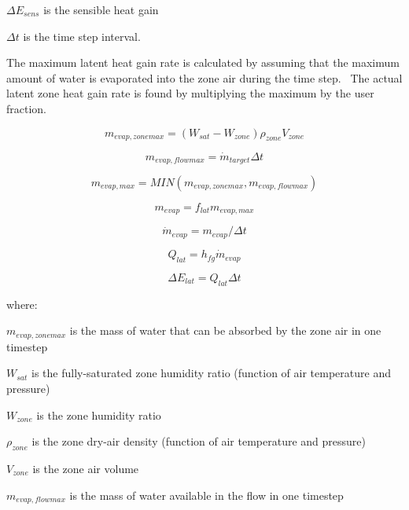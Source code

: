 \(\Delta {E_{sens}}\) is the sensible heat gain

\(\Delta t\) is the time step interval.

The maximum latent heat gain rate is calculated by assuming that the maximum amount of water is evaporated into the zone air during the time step.~ The actual latent zone heat gain rate is found by multiplying the maximum by the user fraction.

\begin{equation}
{m_{evap,zonemax}} = \left( {{W_{sat}} - {W_{zone}}} \right){\rho_{zone}}{V_{zone}}
\end{equation}

\begin{equation}
{m_{evap,flowmax}} = {\dot m_{target}}\Delta t
\end{equation}

\begin{equation}
{m_{evap,max}} = MIN({m_{evap,zonemax}},{m_{evap,flowmax}})
\end{equation}

\begin{equation}
{m_{evap}} = {f_{lat}}{m_{evap,max}}
\end{equation}

\begin{equation}
{\dot m_{evap}} = {m_{evap}}/\Delta t
\end{equation}

\begin{equation}
{Q_{lat}} = {h_{fg}}{\dot m_{evap}}
\end{equation}

\begin{equation}
\Delta {E_{lat}} = {Q_{lat}}\Delta t
\end{equation}

where:

\({m_{evap,zonemax}}\) is the mass of water that can be absorbed by the zone air in one timestep

\({W_{sat}}\) is the fully-saturated zone humidity ratio (function of air temperature and pressure)

\({W_{zone}}\) is the zone humidity ratio

\({\rho_{zone}}\) is the zone dry-air density (function of air temperature and pressure)

\({V_{zone}}\) is the zone air volume

\({m_{evap,flowmax}}\) is the mass of water available in the flow in one timestep

